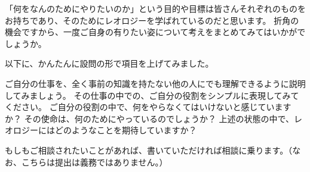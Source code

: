\documentclass[uplatex,dvipdfmx,a4paper,11pt]{jsreport}
\begin{document}
\begin{qparts}
    \qpart 「何をなんのためにやりたいのか」という目的や目標は皆さんそれぞれのものをお持ちであり、そのためにレオロジーを学ばれているのだと思います。
    折角の機会ですから、一度ご自身の有りたい姿について考えをまとめてみてはいかがでしょうか。

    以下に、かんたんに設問の形で項目を上げてみました。
    \vspace{-2mm}
    \begin{qlist}
        \qitem ご自分の仕事を、全く事前の知識を持たない他の人にでも理解できるように説明してみましょう。
        \qitem その仕事の中での、ご自分の役割をシンプルに表現してみてください。
        \qitem ご自分の役割の中で、何をやらなくてはいけないと感じていますか？
        \qitem その使命は、何のためにやっているのでしょうか？
        \qitem 上述の状態の中で、レオロジーにはどのようなことを期待していますか？
    \end{qlist}
    \vspace{-2mm}
    \qpart もしもご相談されたいことがあれば、書いていただければ相談に乗ります。（なお、こちらは提出は義務ではありません。）
\end{qparts}
\end{document}

